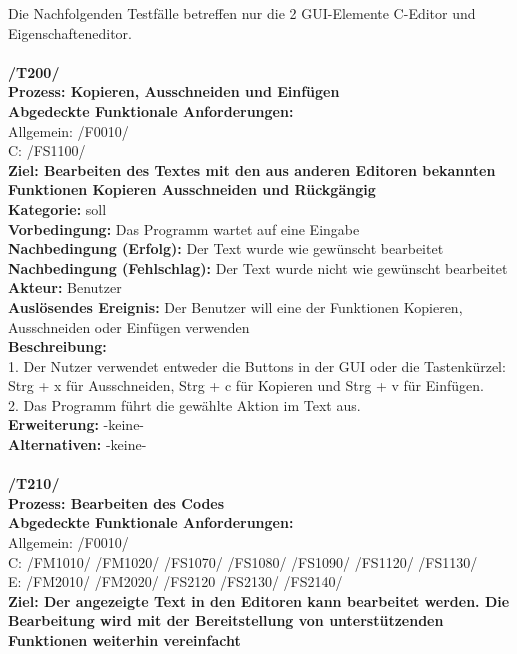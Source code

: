 \documentclass[a4paper]{scrreprt}
\begin{document}
Die Nachfolgenden Testfälle betreffen nur die 2 GUI-Elemente C-Editor und Eigenschafteneditor. \\\\
\textbf{/T200/} \\
\textbf{Prozess: Kopieren, Ausschneiden und Einfügen} \\
\textbf{Abgedeckte Funktionale Anforderungen:}\\
Allgemein: /F0010/ \\
C: /FS1100/ \\
\textbf{Ziel: Bearbeiten des Textes mit den aus anderen Editoren bekannten Funktionen Kopieren Ausschneiden und Rückgängig} \\
\textbf{Kategorie:} soll\\
\textbf{Vorbedingung:} Das Programm wartet auf eine Eingabe\\
\textbf{Nachbedingung (Erfolg):} Der Text wurde wie gewünscht bearbeitet\\
\textbf{Nachbedingung (Fehlschlag):} Der Text wurde nicht wie gewünscht bearbeitet\\
\textbf{Akteur:} Benutzer \\
\textbf{Auslösendes Ereignis:} Der Benutzer will eine der Funktionen Kopieren, Ausschneiden oder Einfügen verwenden\\
\textbf{Beschreibung:} \\
1. Der Nutzer verwendet entweder die Buttons in der GUI oder die Tastenkürzel:\\
Strg + x für Ausschneiden, Strg + c für Kopieren und Strg + v für Einfügen. \\
2. Das Programm führt die gewählte Aktion im Text aus.\\
\textbf {Erweiterung:} -keine- \\
\textbf {Alternativen:} -keine- \\\\
\textbf{/T210/} \\
\textbf{Prozess: Bearbeiten des Codes} \\
\textbf{Abgedeckte Funktionale Anforderungen:}\\
Allgemein: /F0010/  \\
C: /FM1010/ /FM1020/ /FS1070/ /FS1080/ /FS1090/ /FS1120/ /FS1130/   \\
E: /FM2010/ /FM2020/ /FS2120 /FS2130/ /FS2140/ \\
\textbf{Ziel: Der angezeigte Text in den Editoren kann bearbeitet werden. Die Bearbeitung wird mit der Bereitstellung von unterstützenden Funktionen weiterhin vereinfacht} \\
\end{document}
